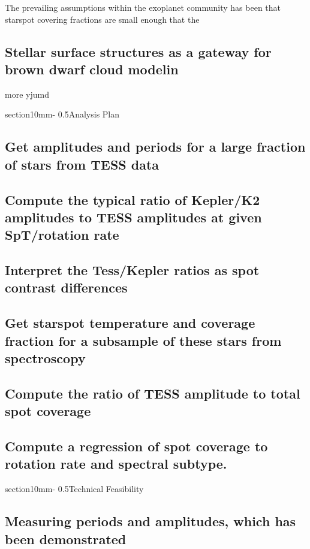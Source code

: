 \documentclass[letterpaper,11pt]{article}
\makeatletter
\renewcommand{\section}{\@startsection%
{section}{1}{0mm}{-\baselineskip}%
{0.5\baselineskip}{\normalfont\Large\bfseries}}%
\makeatother
\begin{document}
The prevailing assumptions within the exoplanet community has been that starspot covering fractions are small enough that the 


\subsection{Stellar surface structures as a gateway for brown dwarf cloud modelin}
more yjumd

\section{Analysis Plan}

\subsection{Get amplitudes and periods for a large fraction of stars from TESS data}
\subsection{Compute the typical ratio of Kepler/K2 amplitudes to TESS amplitudes at given SpT/rotation rate}
\subsection{Interpret the Tess/Kepler ratios as spot contrast differences}
\subsection{Get starspot temperature and coverage fraction for a subsample of these stars from spectroscopy}
\subsection{Compute the ratio of TESS amplitude to total spot coverage}
\subsection{Compute a regression of spot coverage to rotation rate and spectral subtype.}


\section{Technical Feasibility}

\subsection{Measuring periods and amplitudes, which has been demonstrated}
\end{document}
